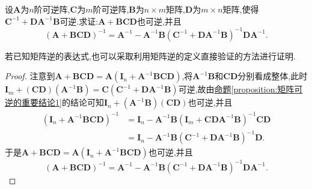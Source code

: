 \documentclass[../../main.tex]{subfiles}%
\begin{document}
\begin{proposition}\label{Sherman-Morrison-Woodbury公式}
设\(\boldsymbol{A}\)为\(n\)阶可逆阵,\(\boldsymbol{C}\)为\(m\)阶可逆阵,\(\boldsymbol{B}\)为\(n\times m\)矩阵,\(\boldsymbol{D}\)为\(m\times n\)矩阵,使得\(\boldsymbol{C}^{-1}+\boldsymbol{D}\boldsymbol{A}^{-1}\boldsymbol{B}\)可逆.求证:\(\boldsymbol{A}+\boldsymbol{B}\boldsymbol{C}\boldsymbol{D}\)也可逆,并且
\[
(\boldsymbol{A}+\boldsymbol{B}\boldsymbol{C}\boldsymbol{D})^{-1}=\boldsymbol{A}^{-1}-\boldsymbol{A}^{-1}\boldsymbol{B}(\boldsymbol{C}^{-1}+\boldsymbol{D}\boldsymbol{A}^{-1}\boldsymbol{B})^{-1}\boldsymbol{D}\boldsymbol{A}^{-1}.
\]
\end{proposition}
\begin{remark}
若已知矩阵逆的表达式,也可以采取利用矩阵逆的定义直接验证的方法进行证明.
\end{remark}
\begin{proof}
注意到\(\boldsymbol{A}+\boldsymbol{B}\boldsymbol{C}\boldsymbol{D}=\boldsymbol{A}(\boldsymbol{I}_{n}+\boldsymbol{A}^{-1}\boldsymbol{B}\boldsymbol{C}\boldsymbol{D})\),将\(\boldsymbol{A}^{-1}\boldsymbol{B}\)和\(\boldsymbol{C}\boldsymbol{D}\)分别看成整体,此时
\(\boldsymbol{I}_{m}+(\boldsymbol{C}\boldsymbol{D})(\boldsymbol{A}^{-1}\boldsymbol{B})=\boldsymbol{C}(\boldsymbol{C}^{-1}+\boldsymbol{D}\boldsymbol{A}^{-1}\boldsymbol{B})\)可逆,故由\hyperref[proposition:矩阵可逆的重要结论1]{命题\ref{proposition:矩阵可逆的重要结论1}}的结论可知\(\boldsymbol{I}_{n}+(\boldsymbol{A}^{-1}\boldsymbol{B})(\boldsymbol{C}\boldsymbol{D})\)也可逆,并且
\begin{align*}
(\boldsymbol{I}_{n}+\boldsymbol{A}^{-1}\boldsymbol{B}\boldsymbol{C}\boldsymbol{D})^{-1}&=\boldsymbol{I}_{n}-\boldsymbol{A}^{-1}\boldsymbol{B}(\boldsymbol{I}_{m}+\boldsymbol{C}\boldsymbol{D}\boldsymbol{A}^{-1}\boldsymbol{B})^{-1}\boldsymbol{C}\boldsymbol{D}\\
&=\boldsymbol{I}_{n}-\boldsymbol{A}^{-1}\boldsymbol{B}(\boldsymbol{C}^{-1}+\boldsymbol{D}\boldsymbol{A}^{-1}\boldsymbol{B})^{-1}\boldsymbol{D}.
\end{align*}
于是\(\boldsymbol{A}+\boldsymbol{B}\boldsymbol{C}\boldsymbol{D}=\boldsymbol{A}(\boldsymbol{I}_{n}+\boldsymbol{A}^{-1}\boldsymbol{B}\boldsymbol{C}\boldsymbol{D})\)也可逆,并且
\[
(\boldsymbol{A}+\boldsymbol{B}\boldsymbol{C}\boldsymbol{D})^{-1}=\boldsymbol{A}^{-1}-\boldsymbol{A}^{-1}\boldsymbol{B}(\boldsymbol{C}^{-1}+\boldsymbol{D}\boldsymbol{A}^{-1}\boldsymbol{B})^{-1}\boldsymbol{D}\boldsymbol{A}^{-1}.
\]
\end{proof}
\end{document}
